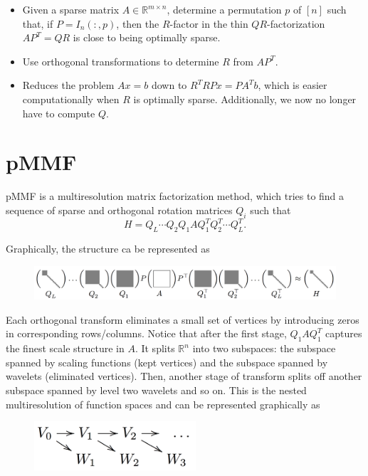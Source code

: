 \documentclass[a4paper]{article}
\newcommand{\R}{\mathbb{R}}
\begin{document}
\begin{itemize}
\item Given a sparse matrix $A \in \mathbb{R}^{m \times n}$, determine a permutation $p$ of $[n]$ such that, if $P = I_n(:,p)$, then the $R$-factor in the thin $QR$-factorization $AP^{T} = QR$ is close to being optimally sparse.
\item Use orthogonal transformations to determine $R$ from $AP^{T}$.
\item Reduces the problem $Ax = b$ down to $R^{T}RPx = PA^{T}b$, which is easier computationally when $R$ is optimally sparse. Additionally, we now no longer have to compute $Q$.
\end{itemize}

\section{pMMF}

pMMF is a multiresolution matrix factorization method, which tries to find a sequence of sparse and orthogonal rotation matrices $Q_i$ such that
$$H = Q_L \cdots Q_2 Q_1 A Q_1^T Q_2^T \cdots Q_L^T .$$

Graphically, the structure ca be represented as

\begin{figure}[H]
\centering
\includegraphics[width = 15cm]{pmmf/pmmf}
\end{figure}

Each orthogonal transform eliminates a small set of vertices by introducing zeros in corresponding rows/columns. Notice that after the first stage, $Q_1AQ_1^T$ captures the finest scale structure in $A$. It splits $\R^n$ into two subspaces: the subspace spanned by scaling functions (kept vertices) and the subspace spanned by wavelets (eliminated vertices). Then, another stage of transform splits off another subspace spanned by level two wavelets and so on. This is the nested multiresolution of function spaces and can be represented graphically as

\begin{figure}[H]
\centering
\includegraphics[width = 6cm]{pmmf/nestedspaces}
\end{figure}
\end{document}
